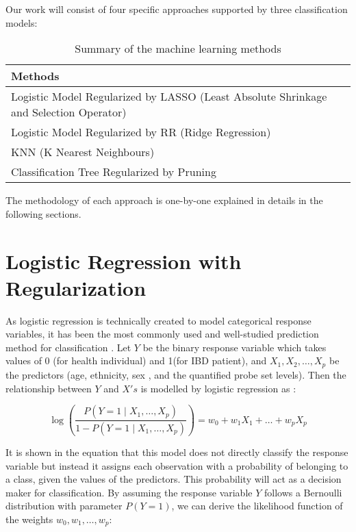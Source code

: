 \documentclass[preprint, 3p,
authoryear]{elsarticle} %
\begin{document}
Our work will consist of four specific approaches supported by three
classification models:

\begin{table}[H]

\caption{\label{tab:unnamed-chunk-1}\label{tab1}Summary of the machine learning methods}
\centering
\begin{tabular}[t]{l}
\hline
Methods\\
\hline
Logistic Model Regularized by LASSO (Least Absolute Shrinkage and Selection Operator)\\
\hline
Logistic Model Regularized by RR (Ridge Regression)\\
\hline
KNN (K Nearest Neighbours)\\
\hline
Classification Tree Regularized by Pruning\\
\hline
\end{tabular}
\end{table}

The methodology of each approach is one-by-one explained in details in
the following sections.

\hypertarget{logistic-regression-with-regularization}{%
\section{Logistic Regression with
Regularization}\label{logistic-regression-with-regularization}}

As logistic regression is technically created to model categorical
response variables, it has been the most commonly used and well-studied
prediction method for classification . Let \(Y\) be the binary response
variable which takes values of 0 (for health individual) and 1(for IBD
patient), and \(X_{1}, X_{2}, \ldots, X_{p}\) be the predictors (age,
ethnicity, sex , and the quantified probe set levels). Then the
relationship between \(Y\) and \(X's\) is modelled by logistic
regression as :

\[
\log \left(\frac{P\left(Y=1 \mid X_{1}, \ldots, X_{p}\right)}{1-P\left(Y=1 \mid X_{1}, \ldots, X_{p}\right)}\right)=w_{0}+w_{1} X_{1}+\ldots+w_{p} X_{p}
\]

It is shown in the equation that this model does not directly classify
the response variable but instead it assigns each observation with a
probability of belonging to a class, given the values of the predictors.
This probability will act as a decision maker for classification. By
assuming the response variable \(Y\) follows a Bernoulli distribution
with parameter \(P(Y=1)\), we can derive the likelihood function of the
weights \(w_{0}, w_{1}, \ldots, w_{p}\):
\end{document}
